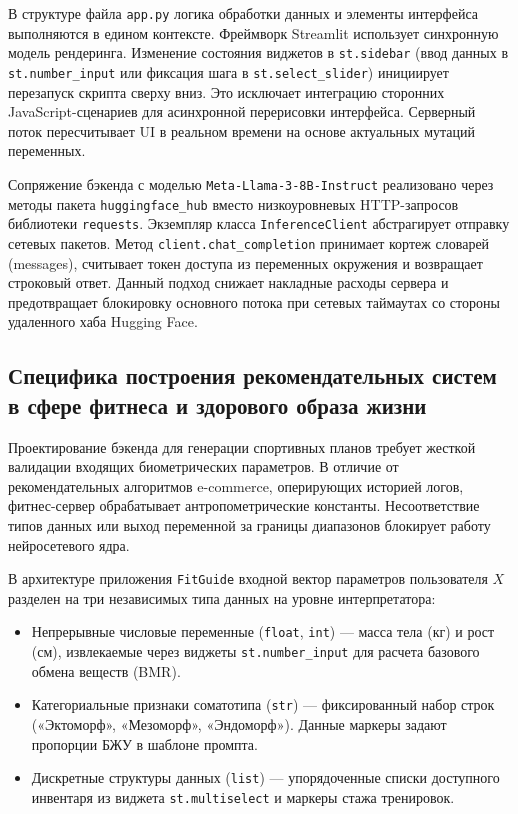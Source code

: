 \documentclass[14pt, a4paper]{extarticle}
\begin{document}
В структуре файла \texttt{app.py} логика обработки данных и элементы интерфейса выполняются в едином контексте. Фреймворк Streamlit\cite{streamlit_doc} использует синхронную модель рендеринга. Изменение состояния виджетов в \texttt{st.sidebar} (ввод данных в \texttt{st.number\_input} или фиксация шага в \texttt{st.select\_slider}) инициирует перезапуск скрипта сверху вниз. Это исключает интеграцию сторонних JavaScript-сценариев для асинхронной перерисовки интерфейса. Серверный поток пересчитывает UI в реальном времени на основе актуальных мутаций переменных.

Сопряжение бэкенда с моделью \texttt{Meta-Llama-3-8B-Instruct} реализовано через методы пакета \texttt{huggingface\_hub} вместо низкоуровневых HTTP-запросов библиотеки \texttt{requests}. Экземпляр класса \texttt{InferenceClient} абстрагирует отправку сетевых пакетов. Метод \texttt{client.chat\_completion} принимает кортеж словарей (messages), считывает токен доступа из переменных окружения и возвращает строковый ответ. Данный подход снижает накладные расходы сервера и предотвращает блокировку основного потока при сетевых таймаутах со стороны удаленного хаба Hugging Face\cite{llama3}.

\subsection{Специфика построения рекомендательных систем в сфере фитнеса и здорового образа жизни}

Проектирование бэкенда для генерации спортивных планов требует жесткой валидации входящих биометрических параметров. В отличие от рекомендательных алгоритмов e-commerce, оперирующих историей логов, фитнес-сервер обрабатывает антропометрические константы. Несоответствие типов данных или выход переменной за границы диапазонов блокирует работу нейросетевого ядра.

В архитектуре приложения \texttt{FitGuide} входной вектор параметров пользователя $X$ разделен на три независимых типа данных на уровне интерпретатора:
\begin{itemize}
    \item Непрерывные числовые переменные (\texttt{float}, \texttt{int}) --- масса тела (кг) и рост (см), извлекаемые через виджеты \texttt{st.number\_input} для расчета базового обмена веществ (BMR)\cite{sports_medicine}.
    \item Категориальные признаки соматотипа (\texttt{str}) --- фиксированный набор строк («Эктоморф», «Мезоморф», «Эндоморф»). Данные маркеры задают пропорции БЖУ в шаблоне промпта.
    \item Дискретные структуры данных (\texttt{list}) --- упорядоченные списки доступного инвентаря из виджета \texttt{st.multiselect} и маркеры стажа тренировок.
\end{itemize}
\end{document}
